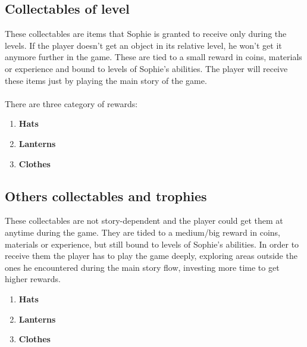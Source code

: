 \subsection{Collectables of level}
These collectables are items that Sophie is granted to receive only during the levels. If the player doesn't get an object in its relative level, he won't get it anymore further in the game.
These are tied to a small reward in coins, materials or experience and bound to levels of Sophie's abilities.
The player will receive these items just by playing the main story of the game.\\\\
There are three category of rewards:
\begin{enumerate}
\item \textbf{Hats}\\
  
\item \textbf{Lanterns}\\
  
\item \textbf{Clothes}\\
  
\end{enumerate}


\subsection{Others collectables and trophies}
These collectables are not story-dependent and the player could get them at anytime during the game. They are tided to a medium/big reward in coins, materials or experience, but still bound to levels of Sophie's abilities. In order to receive them the player has to play the game deeply, exploring areas outside the ones he encountered during the main story flow, investing more time to get higher rewards.
\begin{enumerate}
\item \textbf{Hats}\\
  
\item \textbf{Lanterns}\\
  
\item \textbf{Clothes}\\
  
\end{enumerate}


